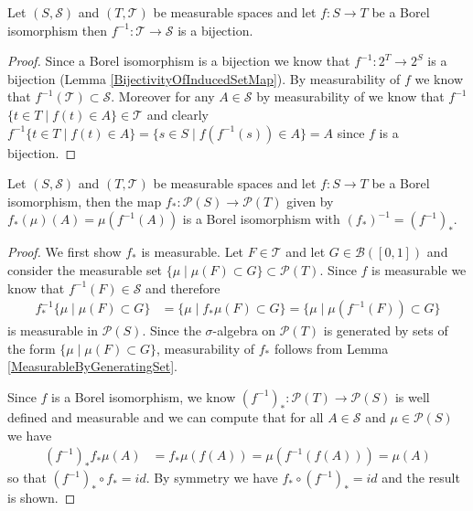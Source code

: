 \begin{lem}\label{InducedBijectionOnSigmaAlgebras}Let $(S,
  \mathcal{S})$ and $(T, \mathcal{T})$ be measurable spaces and let $f
  : S \to T$ be a Borel isomorphism then $f^{-1} : \mathcal{T} \to
  \mathcal{S}$ is a bijection.
\end{lem}
\begin{proof}
Since a Borel isomorphism is a bijection we know that $f^{-1} : 2^T
\to 2^S$ is a bijection (Lemma
\ref{BijectivityOfInducedSetMap}).  By measurability of $f$ we know
that $f^{-1} (\mathcal{T}) \subset \mathcal{S}$.  Moreover for any $A \in
\mathcal{S}$ by measurability of we know that $f^{-1}$ $\lbrace t \in T \mid f(t) \in A \rbrace \in
\mathcal{T}$ and clearly $f^{-1} \lbrace
t \in T \mid f(t) \in A \rbrace = \lbrace s \in S \mid f(f^{-1}(s))
\in A \rbrace = A$ since $f$ is a bijection.
\end{proof}


\begin{lem}\label{InducedBorelIsomorphismOnProbabilityMeasures}Let $(S, \mathcal{S})$ and $(T, \mathcal{T})$ be measurable
  spaces and let $f : S \to T$ be a Borel isomorphism, then the map
  $f_* : \mathcal{P}(S) \to \mathcal{P}(T)$ given by $f_*(\mu)(A) =
  \mu(f^{-1}(A))$ is a Borel isomorphism with $(f_*)^{-1} = (f^{-1})_*$.
\end{lem}
\begin{proof}
We first show $f_*$ is measurable.  Let $F \in \mathcal{T}$ and let $G
\in \mathcal{B}([0,1])$ and consider the measurable set $\lbrace \mu
\mid \mu(F) \subset G \rbrace \subset \mathcal{P}(T)$.  Since $f$ is
measurable we know that $f^{-1}(F) \in \mathcal{S}$ and therefore
\begin{align*}
f_*^{-1} \lbrace \mu \mid \mu(F) \subset G \rbrace &= \lbrace \mu \mid
f_*\mu(F) \subset G \rbrace= \lbrace \mu \mid \mu(f^{-1}(F)) \subset G \rbrace
\end{align*}
is measurable in $\mathcal{P}(S)$.
Since the $\sigma$-algebra on
$\mathcal{P}(T)$ is generated by sets of the form $\lbrace \mu
\mid \mu(F) \subset G \rbrace$, measurability of $f_*$ follows from
Lemma \ref{MeasurableByGeneratingSet}.

Since $f$ is a Borel isomorphism, we know $(f^{-1})_* :
\mathcal{P}(T) \to \mathcal{P}(S)$ is well defined and measurable and
we can compute that for all $A \in \mathcal{S}$ and $\mu \in
\mathcal{P}(S)$ we have
\begin{align*}
(f^{-1})_* f_*\mu(A) &= f_*\mu(f(A)) = \mu(f^{-1}(f(A))) = \mu(A)
\end{align*}
so that $(f^{-1})_* \circ f_* = id$.  By symmetry we have $f_* \circ (f^{-1})_* = id$ and the result is shown.
\end{proof}

